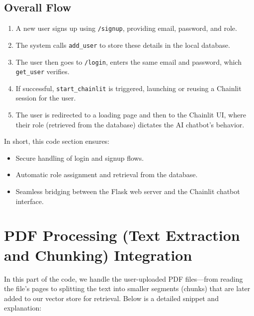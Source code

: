 \subsection{Overall Flow}
\begin{enumerate}
  \item A new user signs up using \texttt{/signup}, providing email, password, and role.
  \item The system calls \texttt{add\_user} to store these details in the local database.
  \item The user then goes to \texttt{/login}, enters the same email and password, which \texttt{get\_user} verifies.
  \item If successful, \texttt{start\_chainlit} is triggered, launching or reusing a Chainlit session for the user.
  \item The user is redirected to a loading page and then to the Chainlit UI, where their role (retrieved from the database) 
        dictates the AI chatbot’s behavior.
\end{enumerate}

\noindent
In short, this code section ensures:
\begin{itemize}
    \item Secure handling of login and signup flows.
    \item Automatic role assignment and retrieval from the database.
    \item Seamless bridging between the Flask web server and the Chainlit chatbot interface.
\end{itemize}

\section{PDF Processing (Text Extraction and Chunking) Integration}
\label{sec:pdf-chunking}

In this part of the code, we handle the user-uploaded PDF files—from reading the file’s pages to splitting the text into smaller segments (chunks) that are later added to our vector store for retrieval. Below is a detailed snippet and explanation:

